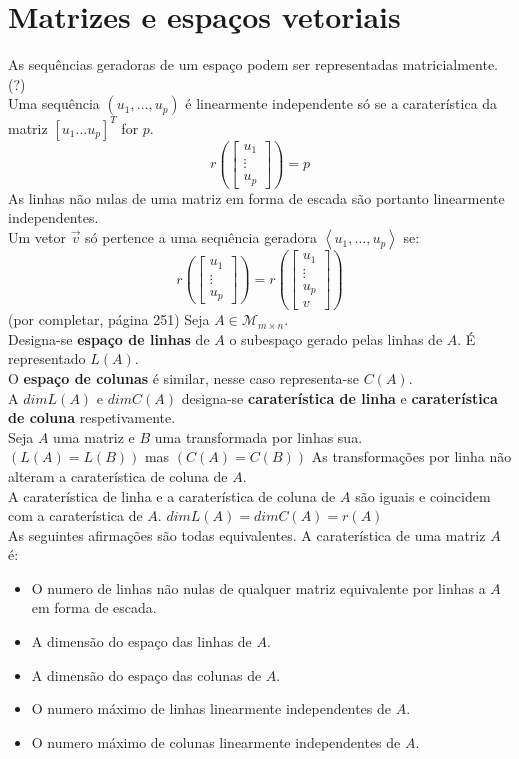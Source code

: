 \documentclass[]{report}
\begin{document}
\section{Matrizes e espaços vetoriais}
As sequências geradoras de um espaço podem ser representadas matricialmente. (?)\\
Uma sequência $(u_1, \dots, u_p)$ é linearmente independente só se a caraterística da matriz $[u_1 \dots u_p]^T$ for $p$.
$$r \left( \begin{bmatrix}
u_1 \\ \vdots \\ u_p
\end{bmatrix} \right)
= p$$
As linhas não nulas de uma matriz em forma de escada são portanto linearmente independentes.\\
Um vetor $\vec v$ só pertence a uma sequência geradora $\left\langle u_1, \dots, u_p \right\rangle$ se:
$$r \left( \begin{bmatrix}
u_1 \\ \vdots \\ u_p
\end{bmatrix} \right)
= r \left( \begin{bmatrix}
u_1 \\ \vdots \\ u_p \\ v
\end{bmatrix} \right)$$
(por completar, página 251)
\vspace{5mm}
Seja $A \in \mathcal{M}_{m \times n}$.\\
Designa-se \textbf{espaço de linhas} de $A$ o subespaço gerado pelas linhas de $A$. É representado $L(A)$.\\
O \textbf{espaço de colunas} é similar, nesse caso representa-se $C(A)$.\\
A $dim L(A)$ e $dim C(A)$ designa-se \textbf{caraterística de linha} e \textbf{caraterística de coluna} respetivamente.\\[2mm]
Seja $A$ uma matriz e $B$ uma transformada por linhas sua.\\
$(L(A) = L(B))$ mas $(C(A) = C(B))$
As transformações por linha não alteram a caraterística de coluna de $A$.\\
A caraterística de linha e a caraterística de coluna de $A$ são iguais e coincidem com a caraterística de $A$.
$dim L(A) = dim C(A) = r(A)$\\
As seguintes afirmações são todas equivalentes. A caraterística de uma matriz $A$ é:\\
\begin{itemize}
\item O numero de linhas não nulas de qualquer matriz equivalente por linhas a $A$ em forma de escada.
\item A dimensão do espaço das linhas de $A$.
\item A dimensão do espaço das colunas de $A$.
\item O numero máximo de linhas linearmente independentes de $A$.
\item O numero máximo de colunas linearmente independentes de $A$.
\end{itemize}
\end{document}
